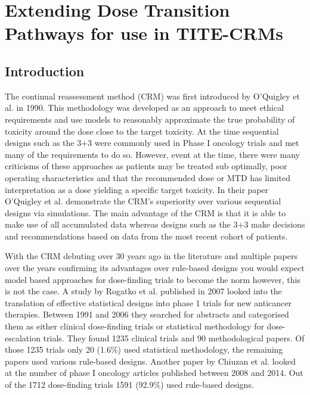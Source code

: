 
\chapter{Extending Dose Transition Pathways for use in TITE-CRMs} %

\label{TITE-DTP} %


\section{Introduction}
\label{tite-dtp:Introduction}

The continual reassessment method (CRM) was first introduced by O'Quigley et al. \cite{oquigleyContinualReassessmentMethod1990} in 1990. This methodology was developed as an approach to meet ethical requirements and use models to reasonably approximate the true probability of toxicity around the dose close to the target toxicity. At the time sequential designs such as the 3+3 were commonly used in Phase \RN{1} oncology trials and  met many of the requirements to do so. However, event at the time, there were many criticisms of these approaches as patients may be treated sub optimally, poor operating characteristics and that the recommended dose or MTD has limited interpretation as a dose yielding a specific target toxicity. In their paper O'Quigley et al. \cite{oquigleyContinualReassessmentMethod1990} demonstrate the CRM's superiority over various sequential designs via simulations. The main advantage of the CRM is that it is able to make use of all accumulated data whereas designs such as the 3+3 make decisions and recommendations based on data from the most recent cohort of patients.

With the CRM debuting over 30 years ago in the literature and multiple papers over the years confirming its advantages over rule-based designs you would expect model based approaches for dose-finding trials to become the norm however, this is not the case. A study by Rogatko et al. \cite{rogatkoTranslationInnovativeDesigns2007} published in 2007 looked into the translation of effective statistical designs into phase 1 trials for new anticancer therapies. Between 1991 and 2006 they searched for abstracts and categorised them as either clinical dose-finding trials or statistical methodology for dose-escalation trials. They found 1235 clinical trials and 90 methodological papers. Of those 1235 trials only 20 (1.6\%) used statistical methodology, the remaining papers used various rule-based designs. Another paper by Chiuzan et al. \cite{chiuzanDosefindingDesignsTrials2017} looked at the number of phase \RN{1} oncology articles published between 2008 and 2014. Out of the 1712 dose-finding trials 1591 (92.9\%) used rule-based designs. 

